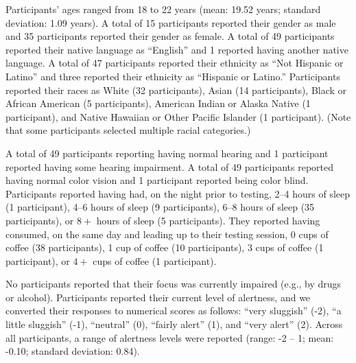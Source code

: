 \documentclass[10pt]{article}
\begin{document}
Participants' ages ranged from 18 to 22 years (mean: 19.52 years;
standard deviation: 1.09 years). A total of 15 participants reported
their gender as male and 35 participants reported their gender as
female. A total of 49 participants reported their native language as
``English'' and 1 reported having another native language. A total of
47 participants reported their ethnicity as ``Not Hispanic or Latino''
and three reported their ethnicity as ``Hispanic or Latino.''
Participants reported their races as White (32 participants), Asian
(14 participants), Black or African American (5 participants),
American Indian or Alaska Native (1 participant), and Native Hawaiian or
Other Pacific Islander (1 participant). (Note that some participants
selected multiple racial categories.)

A total of 49 participants reporting having normal hearing and 1
participant reported having some hearing impairment. A total of 49
participants reported having normal color vision and 1 participant
reported being color blind.  Participants reported having had, on the
night prior to testing, 2--4 hours of sleep (1 participant), 4--6
hours of sleep (9 participants), 6--8 hours of sleep (35
participants), or $8+$ hours of sleep (5 participants). They reported
having consumed, on the same day and leading up to their testing
session, 0 cups of coffee (38 participants), 1 cup of coffee (10
participants), 3 cups of coffee (1 participant), or $4+$ cups of
coffee (1 participant).

No participants reported that their focus was currently impaired
(e.g., by drugs or alcohol).  Participants reported their current
level of alertness, and we converted their responses to numerical
scores as follows: ``very sluggish'' (-2), ``a little sluggish'' (-1),
``neutral'' (0), ``fairly alert'' (1), and ``very alert'' (2). Across
all participants, a range of alertness levels were reported (range: -2
-- 1; mean: -0.10; standard deviation: 0.84).
\end{document}
